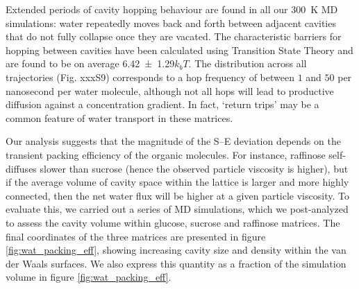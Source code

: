 Extended periods of cavity hopping behaviour are found in all our \SI{300}{\kelvin} MD simulations: water repeatedly moves back and forth between adjacent cavities that do not fully collapse once they are vacated. The characteristic barriers for hopping between cavities have been calculated using Transition State Theory and are found to be on average \num{6.42\pm1.29}$k_{b}T$. The distribution across all trajectories (Fig. xxxS9) corresponds to a hop frequency of between $1$ and $50$ per nanosecond per water molecule, although not all hops will lead to productive diffusion against a concentration gradient. In fact, `return trips’ may be a common feature of water transport in these matrices.

Our analysis suggests that the magnitude of the S–E deviation depends on the transient packing efficiency of the organic molecules. For instance, raffinose self-diffuses slower than sucrose (hence the observed particle viscosity is higher), but if the average volume of cavity space within the lattice is larger and more highly connected, then the net water flux will be higher at a given particle viscosity. To evaluate this, we carried out a series of MD simulations, which we post-analyzed to assess the cavity volume within glucose, sucrose and raffinose matrices. The final coordinates of the three matrices are presented in figure \ref{fig:wat_packing_eff}, showing increasing cavity size and density within the van der Waals surfaces. We also express this quantity as a fraction of the simulation volume in figure \ref{fig:wat_packing_eff}.

